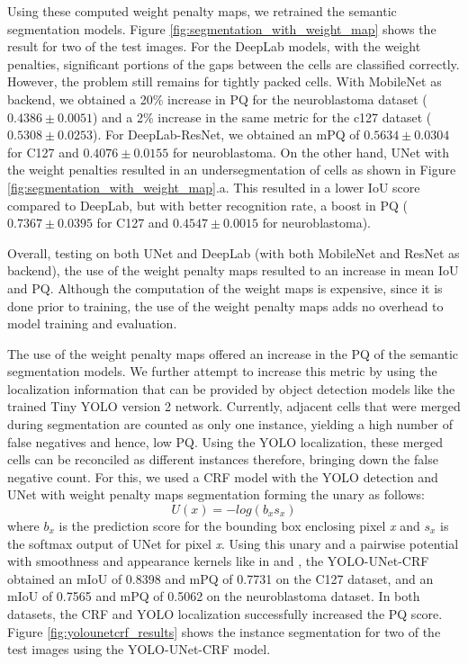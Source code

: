\documentclass[10pt, journal, compsoc]{IEEEtran}
\begin{document}
Using these computed weight penalty maps, we retrained the semantic segmentation models. Figure \ref{fig:segmentation_with_weight_map} shows the result for two of the test images. For the DeepLab models, with the weight penalties, significant portions of the gaps between the cells are classified correctly. However, the problem still remains for tightly packed cells. With MobileNet as backend, we obtained a 20\% increase in PQ for the neuroblastoma dataset ($0.4386\pm0.0051$) and a 2\% increase in the same metric for the c127 dataset ($0.5308\pm0.0253$). For DeepLab-ResNet, we obtained an mPQ of $0.5634\pm0.0304$ for C127 and $0.4076\pm0.0155$ for neuroblastoma. On the other hand, UNet with the weight penalties resulted in an undersegmentation of cells as shown in Figure \ref{fig:segmentation_with_weight_map}.a. This resulted in a lower IoU score compared to DeepLab, but with better recognition rate, a boost in PQ ($0.7367\pm0.0395$ for C127 and $0.4547\pm0.0015$ for neuroblastoma).

Overall, testing on both UNet and DeepLab (with both MobileNet and ResNet as backend), the use of the weight penalty maps resulted to an increase in mean IoU and PQ. Although the computation of the weight maps is expensive, since it is done prior to training, the use of the weight penalty maps adds no overhead to model training and evaluation.

The use of the weight penalty maps offered an increase in the PQ of the semantic segmentation models. We further attempt to increase this metric by using the localization information that can be provided by object detection models like the trained Tiny YOLO version 2 network. Currently, adjacent cells that were merged during segmentation are counted as only one instance, yielding a high number of false negatives and hence, low PQ. Using the YOLO localization, these merged cells can be reconciled as different instances therefore, bringing down the false negative count. For this, we used a CRF model with the YOLO detection and UNet with weight penalty maps segmentation forming the unary as follows:
\begin{equation}
U(x) = -log(b_x s_x)
\end{equation}
where $b_x$ is the prediction score for the bounding box enclosing pixel \textit{x} and $s_x$ is the softmax output of UNet for pixel \textit{x}. Using this unary and a pairwise potential with smoothness and appearance kernels like in \cite{NIPS2011_4296} and \cite{Teichmann2018ConvolutionalCF}, the YOLO-UNet-CRF obtained an mIoU of 0.8398 and mPQ of 0.7731 on the C127 dataset, and an mIoU of 0.7565 and mPQ of 0.5062 on the neuroblastoma dataset. In both datasets, the CRF and YOLO localization successfully increased the PQ score. Figure \ref{fig:yolounetcrf_results} shows the instance segmentation for two of the test images using the YOLO-UNet-CRF model.
\end{document}
